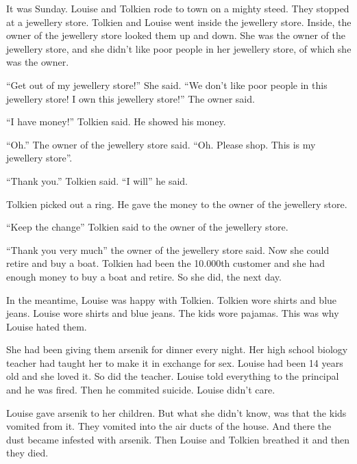It was Sunday. Louise and Tolkien rode to town on a mighty steed.
They stopped at a jewellery store. Tolkien and Louise went inside
the jewellery store. Inside, the owner of the jewellery store
looked them up and down. She was the owner of the jewellery store,
and she didn't like poor people in her jewellery store, of which
she was the owner.



``Get out of my jewellery store!'' She said. ``We don't like poor
people in this jewellery store! I own this jewellery store!'' The
owner said.



``I have money!'' Tolkien said. He showed his money.



``Oh.'' The owner of the jewellery store said. ``Oh. Please shop. This
is my jewellery store''.



``Thank you.'' Tolkien said. ``I will'' he said.



Tolkien picked out a ring. He gave the money to the owner of the
jewellery store.



``Keep the change'' Tolkien said to the owner of the jewellery
store.



``Thank you very much'' the owner of the jewellery store said. Now
she could retire and buy a boat. Tolkien had been the 10.000th
customer and she had enough money to buy a boat and retire. So she
did, the next day.



In the meantime, Louise was happy with Tolkien. Tolkien wore shirts
and blue jeans. Louise wore shirts and blue jeans. The kids wore
pajamas. This was why Louise hated them.



She had been giving them arsenik for dinner every night. Her high
school biology teacher had taught her to make it in exchange for
sex. Louise had been 14 years old and she loved it. So did the
teacher. Louise told everything to the principal and he was fired.
Then he commited suicide. Louise didn't care.



Louise gave arsenik to her children. But what she didn't know, was
that the kids vomited from it. They vomited into the air ducts of
the house. And there the dust became infested with arsenik. Then
Louise and Tolkien breathed it and then they died.



